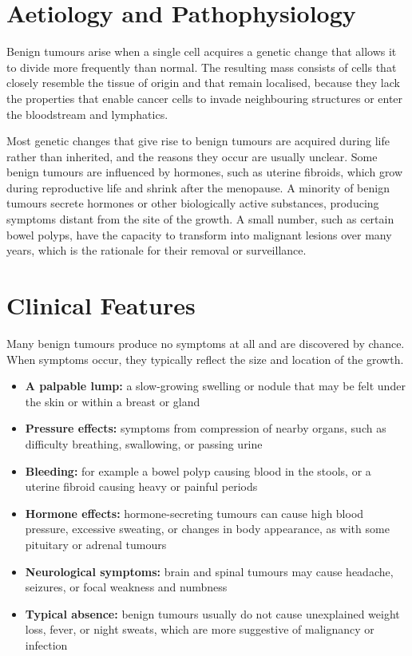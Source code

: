 \section*{Aetiology and Pathophysiology}
Benign tumours arise when a single cell acquires a genetic change that allows it to divide more frequently than normal. The resulting mass consists of cells that closely resemble the tissue of origin and that remain localised, because they lack the properties that enable cancer cells to invade neighbouring structures or enter the bloodstream and lymphatics.

Most genetic changes that give rise to benign tumours are acquired during life rather than inherited, and the reasons they occur are usually unclear. Some benign tumours are influenced by hormones, such as uterine fibroids, which grow during reproductive life and shrink after the menopause. A minority of benign tumours secrete hormones or other biologically active substances, producing symptoms distant from the site of the growth. A small number, such as certain bowel polyps, have the capacity to transform into malignant lesions over many years, which is the rationale for their removal or surveillance.

\section*{Clinical Features}
Many benign tumours produce no symptoms at all and are discovered by chance. When symptoms occur, they typically reflect the size and location of the growth.

\begin{itemize}
    \item \textbf{A palpable lump:} a slow-growing swelling or nodule that may be felt under the skin or within a breast or gland
    \item \textbf{Pressure effects:} symptoms from compression of nearby organs, such as difficulty breathing, swallowing, or passing urine
    \item \textbf{Bleeding:} for example a bowel polyp causing blood in the stools, or a uterine fibroid causing heavy or painful periods
    \item \textbf{Hormone effects:} hormone-secreting tumours can cause high blood pressure, excessive sweating, or changes in body appearance, as with some pituitary or adrenal tumours
    \item \textbf{Neurological symptoms:} brain and spinal tumours may cause headache, seizures, or focal weakness and numbness
    \item \textbf{Typical absence:} benign tumours usually do not cause unexplained weight loss, fever, or night sweats, which are more suggestive of malignancy or infection
\end{itemize}

